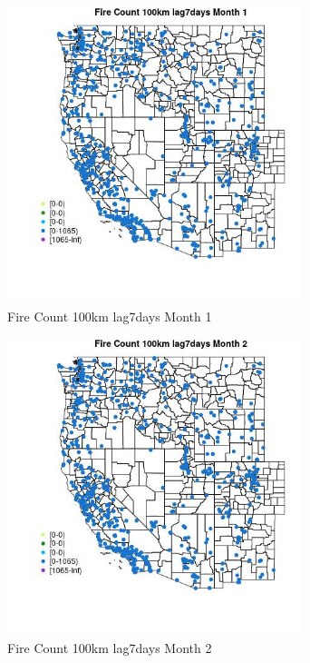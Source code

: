 \begin{figure} 
\centering  
\includegraphics[width=0.77\textwidth]{Code_Outputs/Report_ML_input_PM25_Step4_part_f_de_duplicated_aveswNAs_MapObsMo1Fire_Count_100km_lag7days.jpg} 
\caption{\label{fig:Report_ML_input_PM25_Step4_part_f_de_duplicated_aveswNAsMapObsMo1Fire_Count_100km_lag7days}Fire Count 100km lag7days Month 1} 
\end{figure} 
 

\begin{figure} 
\centering  
\includegraphics[width=0.77\textwidth]{Code_Outputs/Report_ML_input_PM25_Step4_part_f_de_duplicated_aveswNAs_MapObsMo2Fire_Count_100km_lag7days.jpg} 
\caption{\label{fig:Report_ML_input_PM25_Step4_part_f_de_duplicated_aveswNAsMapObsMo2Fire_Count_100km_lag7days}Fire Count 100km lag7days Month 2} 
\end{figure} 
 

